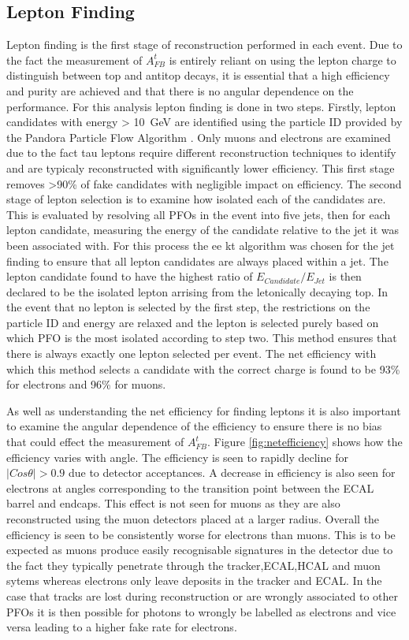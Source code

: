 \subsection{Lepton Finding}

Lepton finding is the first stage of reconstruction performed in each event. Due to the fact the measurement of $A_{FB}^{t}$ is entirely reliant on using the lepton charge to distinguish between top and antitop decays, it is essential that a high efficiency and purity are achieved and that there is no angular dependence on the performance. For this analysis lepton finding is done in two steps. Firstly, lepton candidates with energy > 10~GeV are identified using the particle ID provided by the Pandora Particle Flow Algorithm \cite{Thomson200925}. Only muons and electrons are examined due to the fact tau leptons require different reconstruction techniques to identify and are typicaly reconstructed with significantly lower efficiency. This first stage removes >90\% of fake candidates with negligible impact on efficiency. The second stage of lepton selection is to examine how isolated each of the candidates are. This is evaluated by resolving all PFOs in the event into five jets, then for each lepton candidate, measuring the energy of the candidate relative to the jet it was been associated with. For this process the ee kt algorithm was chosen for the jet finding to ensure that all lepton candidates are always placed within a jet. The lepton candidate found to have the highest ratio of $E_{Candidate}/E_{Jet}$ is then declared to be the isolated lepton arrising from the letonically decaying top. In the event that no lepton is selected by the first step, the restrictions on the particle ID and energy are relaxed and the lepton is selected purely based on which PFO is the most isolated according to step two. This method ensures that there is always exactly one lepton selected per event. The net efficiency with which this method selects a candidate with the correct charge is found to be 93\% for electrons and 96\% for muons.

As well as understanding the net efficiency for finding leptons it is also important to examine the angular dependence of the efficiency to ensure there is no bias that could effect the measurement of $A_{FB}^{t}$. Figure \ref{fig:netefficiency} shows how the efficiency varies with angle. The efficiency is seen to rapidly decline for $|Cos\theta| > 0.9$ due to detector acceptances. A decrease in efficiency is also seen for electrons at angles corresponding to the transition point between the ECAL barrel and endcaps. This effect is not seen for muons as they are also reconstructed using the muon detectors placed at a larger radius. Overall the efficiency is seen to be consistently worse for electrons than muons. This is to be expected as muons produce easily recognisable signatures in the detector due to the fact they typically penetrate through the tracker,ECAL,HCAL and muon sytems whereas electrons only leave deposits in the tracker and ECAL. In the case that tracks are lost during reconstruction or are wrongly associated to other PFOs it is then possible for photons to wrongly be labelled as electrons and vice versa leading to a higher fake rate for electrons.

